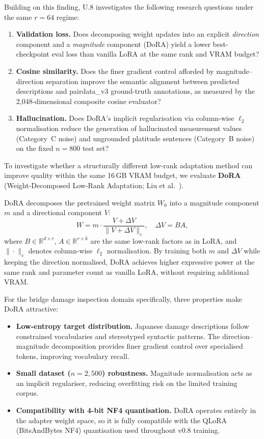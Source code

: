\documentclass[onecolumn]{article}
\begin{document}
Building on this finding, U.8 investigates the following research questions
under the same $r=64$ regime:
\begin{enumerate}[label=(\roman*)]
  \item \textbf{Validation loss.} Does decomposing weight updates into an
        explicit \emph{direction} component and a \emph{magnitude} component
        (DoRA) yield a lower best-checkpoint eval loss than vanilla LoRA at
        the same rank and VRAM budget?
  \item \textbf{Cosine similarity.} Does the finer gradient control
        afforded by magnitude--direction separation improve the semantic
        alignment between predicted descriptions and pairdata\_v3
        ground-truth annotations, as measured by the 2{,}048-dimensional
        composite cosine evaluator?
  \item \textbf{Hallucination.} Does DoRA's implicit regularisation via
        column-wise $\ell_2$ normalisation reduce the generation of
        hallucinated measurement values (Category~C noise) and
        ungrounded platitude sentences (Category~B noise) on the
        fixed $n{=}800$ test set?
\end{enumerate}

To investigate whether a structurally different low-rank adaptation method
can improve quality within the same 16\,GB VRAM budget,
we evaluate \textbf{DoRA}
(Weight-Decomposed Low-Rank Adaptation; Liu et al.~\cite{liu2024dora}).

DoRA decomposes the pretrained weight matrix $W_0$ into a magnitude
component $m$ and a directional component $V$:
\[
  W = m \cdot \frac{V + \Delta V}{\|V + \Delta V\|_c},
  \quad
  \Delta V = B A,
\]
where $B \in \mathbb{R}^{d \times r}$, $A \in \mathbb{R}^{r \times k}$
are the same low-rank factors as in LoRA, and $\|\cdot\|_c$ denotes
column-wise $\ell_2$ normalisation.
By training both $m$ and $\Delta V$ while keeping the direction normalised,
DoRA achieves higher expressive power at the same rank and parameter count
as vanilla LoRA, without requiring additional VRAM.

For the bridge damage inspection domain specifically, three properties make
DoRA attractive:
\begin{itemize}
  \item \textbf{Low-entropy target distribution.}
        Japanese damage descriptions follow constrained vocabularies and
        stereotyped syntactic patterns.
        The direction--magnitude decomposition provides finer gradient
        control over specialised tokens, improving vocabulary recall.
  \item \textbf{Small dataset ($n{=}2{,}500$) robustness.}
        Magnitude normalisation acts as an implicit regulariser, reducing
        overfitting risk on the limited training corpus.
  \item \textbf{Compatibility with 4-bit NF4 quantisation.}
        DoRA operates entirely in the adapter weight space, so it is fully
        compatible with the QLoRA (BitsAndBytes NF4) quantisation used
        throughout v0.8 training.
\end{itemize}
\end{document}
